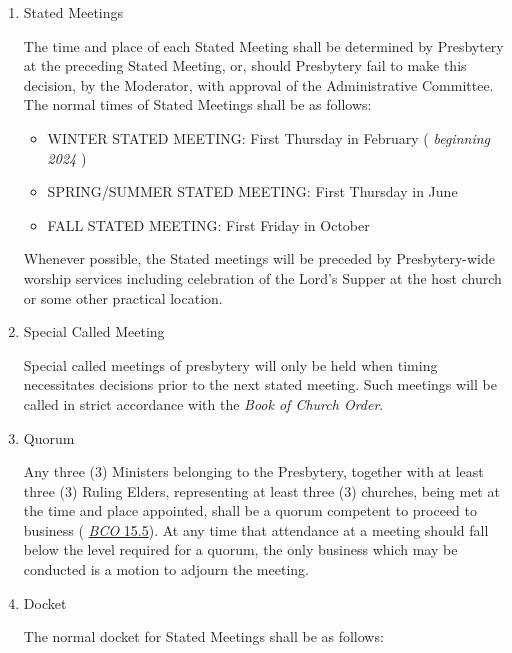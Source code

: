 \documentclass[
]{book}
\providecommand{\tightlist}{%
  \setlength{\itemsep}{0pt}\setlength{\parskip}{0pt}}
\begin{document}
\begin{enumerate}
\def\labelenumi{\Alph{enumi}.}
\item
  Stated Meetings

  The time and place of each Stated Meeting shall be determined by Presbytery at the preceding Stated Meeting, or, should Presbytery fail to make this decision, by the Moderator, with approval of the Administrative Committee. The normal times of Stated Meetings shall be as follows:

  \begin{itemize}
  \tightlist
  \item
    WINTER STATED MEETING: First Thursday in February ( \emph{beginning 2024} )
  \item
    SPRING/SUMMER STATED MEETING: First Thursday in June
  \item
    FALL STATED MEETING: First Friday in October
  \end{itemize}

  Whenever possible, the Stated meetings will be preceded by Presbytery-wide worship services including celebration of the Lord's Supper at the host church or some other practical location.
\item
  Special Called Meeting

  Special called meetings of presbytery will only be held when timing necessitates decisions prior to the next stated meeting. Such meetings will be called in strict accordance with the \emph{Book of Church Order}.
\item
  Quorum

  Any three (3) Ministers belonging to the Presbytery, together with at least three (3) Ruling Elders, representing at least three (3) churches, being met at the time and place appointed, shall be a quorum competent to proceed to business ( \href{https://bco.evangelpresbytery.com/form-of-government.html\#the-presbytery}{\emph{BCO} 15.5}). At any time that attendance at a meeting should fall below the level required for a quorum, the only business which may be conducted is a motion to adjourn the meeting.
\item
  Docket

  The normal docket for Stated Meetings shall be as follows:


\end{enumerate}
\end{document}
